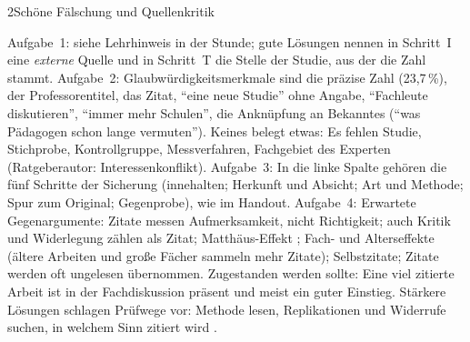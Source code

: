 \begin{uebungsblattb}{2}{Schöne Fälschung und Quellenkritik}
\begin{lehrhinweis}[Erwartungshorizont]
Aufgabe~1: siehe Lehrhinweis in der Stunde; gute
Lösungen nennen in Schritt~I eine \emph{externe} Quelle und in
Schritt~T die Stelle der Studie, aus der die Zahl stammt.
Aufgabe~2: Glaubwürdigkeitsmerkmale sind die präzise Zahl (23,7\,\%),
der Professorentitel, das Zitat, \enquote{eine neue Studie} ohne Angabe,
\enquote{Fachleute diskutieren}, \enquote{immer mehr Schulen}, die
Anknüpfung an Bekanntes (\enquote{was Pädagogen schon lange vermuten}).
Keines belegt etwas: Es fehlen Studie, Stichprobe, Kontrollgruppe,
Messverfahren, Fachgebiet des Experten (Ratgeberautor:
Interessenkonflikt).
Aufgabe~3: In die linke Spalte gehören die fünf Schritte der Sicherung
(innehalten; Herkunft und Absicht; Art und Methode; Spur zum Original;
Gegenprobe), wie im Handout.
Aufgabe~4: Erwartete Gegenargumente: Zitate messen Aufmerksamkeit, nicht
Richtigkeit; auch Kritik und Widerlegung zählen als Zitat; Matthäus-Effekt
\parencite{merton1968matthew}; Fach- und Alterseffekte (ältere Arbeiten
und große Fächer sammeln mehr Zitate); Selbstzitate; Zitate werden oft
ungelesen übernommen. Zugestanden werden sollte: Eine viel zitierte
Arbeit ist in der Fachdiskussion präsent und meist ein guter Einstieg.
Stärkere Lösungen schlagen Prüfwege vor: Methode lesen, Replikationen
und Widerrufe suchen, in welchem Sinn zitiert wird
\parencite{dora2012,hicks2015leiden}.
\end{lehrhinweis}
\end{uebungsblattb}

